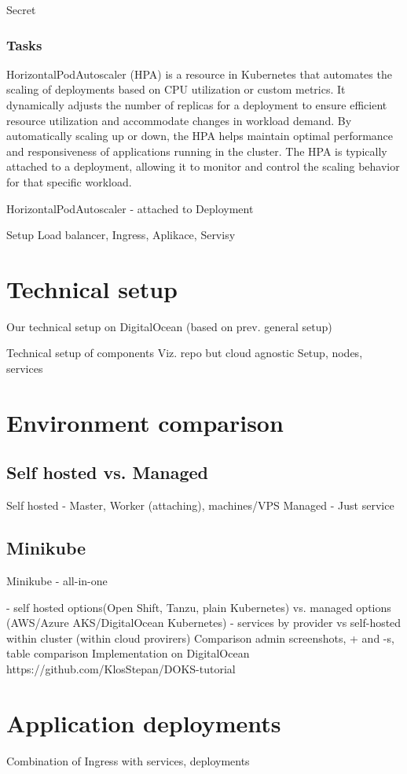 \documentclass{article}
\begin{document}
Secret
\subsubsection{Tasks}
HorizontalPodAutoscaler (HPA) is a resource in Kubernetes that automates the scaling of deployments based on CPU utilization or custom metrics. It dynamically adjusts the number of replicas for a deployment to ensure efficient resource utilization and accommodate changes in workload demand. By automatically scaling up or down, the HPA helps maintain optimal performance and responsiveness of applications running in the cluster. The HPA is typically attached to a deployment, allowing it to monitor and control the scaling behavior for that specific workload.

HorizontalPodAutoscaler - attached to Deployment

Setup Load balancer, Ingress, Aplikace, Servisy
\section{Technical setup}
Our technical setup on DigitalOcean (based on prev. general setup) \par
Technical setup of components
Viz. repo but cloud agnostic
Setup, nodes, services
\section{Environment comparison}
\subsection{Self hosted vs. Managed}
Self hosted - Master, Worker (attaching), machines/VPS
Managed - Just service
\subsection{Minikube}
Minikube - all-in-one

- self hosted options(Open Shift, Tanzu, plain Kubernetes) vs. managed options (AWS/Azure AKS/DigitalOcean Kubernetes)
- services by provider vs self-hosted within cluster (within cloud provirers)
Comparison admin screenshots, + and -s, table comparison
Implementation on DigitalOcean https://github.com/KlosStepan/DOKS-tutorial
\section{Application deployments}
Combination of Ingress with services, deployments
\end{document}

